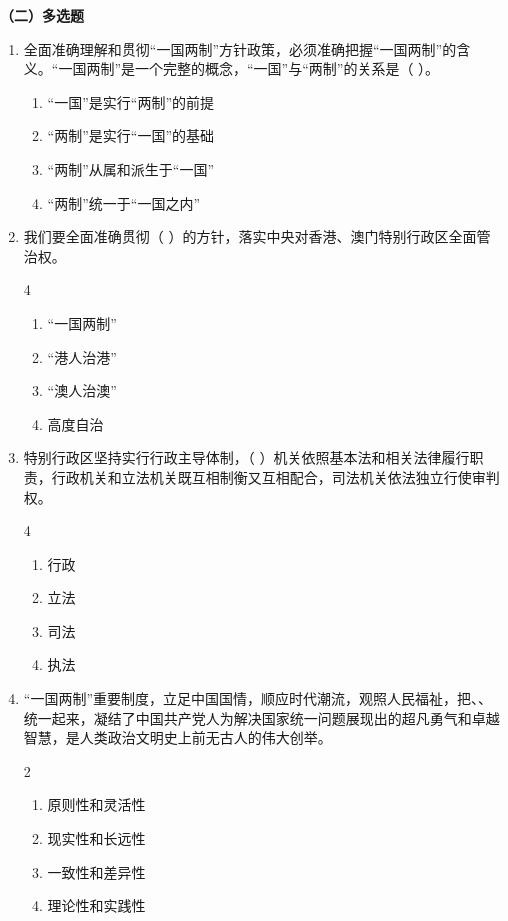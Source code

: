 \documentclass[a4paper,11pt]{ctexart}
\begin{document}
\textbf{（二）多选题}
\begin{enumerate}
    \item 全面准确理解和贯彻“一国两制”方针政策，必须准确把握“一国两制”的含义。“一国两制”是一个完整的概念，“一国”与“两制”的关系是（ ）。
    \begin{enumerate}
        \item “一国”是实行“两制”的前提
        \item “两制”是实行“一国”的基础
        \item “两制”从属和派生于“一国”
        \item “两制”统一于“一国之内”
    \end{enumerate}

    \item 我们要全面准确贯彻（ ）的方针，落实中央对香港、澳门特别行政区全面管治权。
    \begin{multicols}{4}
    \begin{enumerate}
        \item “一国两制”
        \item “港人治港”
        \item “澳人治澳”
        \item 高度自治
    \end{enumerate}
    \end{multicols}

    \item 特别行政区坚持实行行政主导体制，（ ）机关依照基本法和相关法律履行职责，行政机关和立法机关既互相制衡又互相配合，司法机关依法独立行使审判权。
    \begin{multicols}{4}
    \begin{enumerate}
        \item 行政
        \item 立法
        \item 司法
        \item 执法
    \end{enumerate}
    \end{multicols}

    \item “一国两制”重要制度，立足中国国情，顺应时代潮流，观照人民福祉，把、、统一起来，凝结了中国共产党人为解决国家统一问题展现出的超凡勇气和卓越智慧，是人类政治文明史上前无古人的伟大创举。
    \begin{multicols}{2}
    \begin{enumerate}
        \item 原则性和灵活性
        \item 现实性和长远性
        \item 一致性和差异性
        \item 理论性和实践性
    \end{enumerate}
    \end{multicols}


\end{enumerate}
\end{document}
